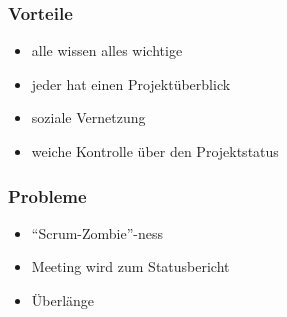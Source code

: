 \documentclass[%
	handout
]{beamer}
\begin{document}
		\begin{frame}
			\frametitle{Vorteile}
			\begin{itemize}
				\item alle wissen alles wichtige
				\item jeder hat einen Projektüberblick
				\item soziale Vernetzung
				\item weiche Kontrolle über den Projektstatus
			\end{itemize}
		\end{frame}
		
		\begin{frame}
			\frametitle{Probleme}
			\begin{itemize}
				\item ``Scrum-Zombie''-ness
				\item Meeting wird zum Statusbericht
				\item Überlänge
			\end{itemize}
		\end{frame}
		
\section{}
\end{document}
